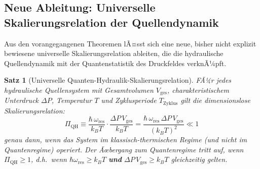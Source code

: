 ﻿\documentclass[12pt,a4paper]{report}
\newtheorem{theorem}{Satz}[chapter]
\begin{document}
\subsection{Neue Ableitung: Universelle Skalierungsrelation der Quellendynamik}

Aus den vorangegangenen Theoremen lÃ¤sst sich eine neue, bisher nicht explizit bewiesene universelle Skalierungsrelation ableiten, die die hydraulische Quellendynamik mit der Quantenstatistik des Druckfeldes verknÃ¼pft.

\begin{theorem}[Universelle Quanten-Hydraulik-Skalierungsrelation]
	\label{thm:skalierung}
	FÃ¼r jedes hydraulische Quellensystem mit Gesamtvolumen $V_\mathrm{ges}$, charakteristischem Unterdruck $\Delta P$, Temperatur $T$ und Zyklusperiode $T_\mathrm{Zyklus}$ gilt die dimensionslose Skalierungsrelation:
	\begin{equation}
		\Pi_\mathrm{QH} \equiv \frac{\hbar\,\omega_\mathrm{res}}{k_BT} \cdot \frac{\Delta P\,V_\mathrm{ges}}{k_BT} = \frac{\hbar\,\omega_\mathrm{res}\,\Delta P\,V_\mathrm{ges}}{(k_BT)^2} \ll 1
		\label{eq:pi_qh}
	\end{equation}
	genau dann, wenn das System im klassisch-thermischen Regime (und nicht im Quantenregime) operiert. Der Ãœbergang zum Quantenregime tritt auf, wenn $\Pi_\mathrm{QH} \geq 1$, d.h.\ wenn $\hbar\omega_\mathrm{res} \geq k_BT$ \textbf{und} $\Delta P\,V_\mathrm{ges} \geq k_BT$ gleichzeitig gelten.
\end{theorem}
\end{document}
